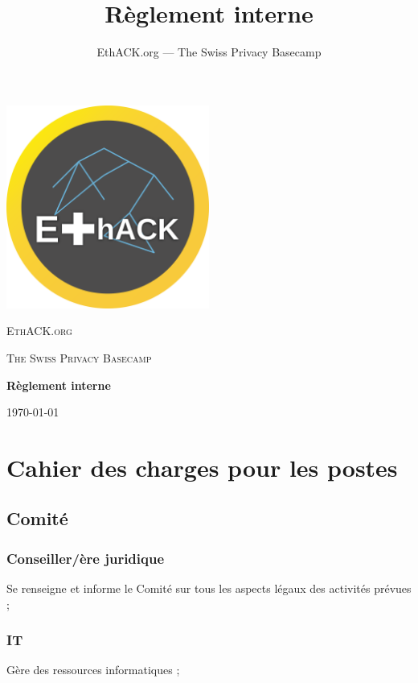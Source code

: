 \documentclass[12pt,twoside]{report}
\author{EthACK.org — The Swiss Privacy Basecamp}
\title{Règlement interne}
\begin{document}
\begin{titlepage}
\centering
\includegraphics[width=0.50\textwidth]{../logo-4096.png}\par\vspace{2cm}
{\scshape\LARGE EthACK.org \par}
\vspace{1cm}
{\scshape\Large The Swiss Privacy Basecamp \par}
\vspace{1.5cm}
{\huge\bfseries Règlement interne\par}

\vfill
{\large \today\par}
\end{titlepage}

\tableofcontents

\setlength{\parindent}{0cm}

\chapter*{Cahier des charges pour les postes}
\section*{Comité}

\subsection*{Conseiller/ère juridique}
Se renseigne et informe le Comité sur tous les aspects légaux des activités prévues ;

\subsection*{IT}
Gère des ressources informatiques ;
\end{document}
